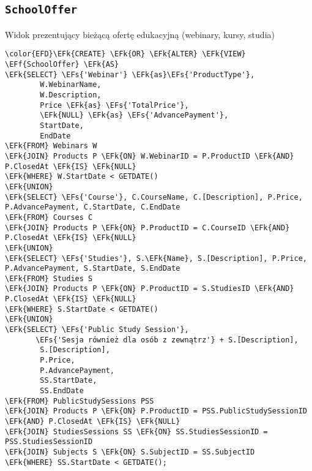 \documentclass[11pt]{article}
\newcommand{\EFs}[1]{\textcolor{EFs}{#1}} %
\newcommand{\EFk}[1]{\textcolor{EFk}{\textbf{#1}}} %
\newcommand{\EFf}[1]{\textcolor{EFf}{#1}} %
\begin{document}
\subsection{\texttt{SchoolOffer}}
\label{sec:orgd186820}
Widok prezentujący bieżącą ofertę edukacyjną (webinary, kursy, studia)
\begin{Code}
\begin{Verbatim}
\color{EFD}\EFk{CREATE} \EFk{OR} \EFk{ALTER} \EFk{VIEW} \EFf{SchoolOffer} \EFk{AS}
\EFk{SELECT} \EFs{'Webinar'} \EFk{as}\EFs{'ProductType'},
        W.WebinarName,
        W.Description,
        Price \EFk{as} \EFs{'TotalPrice'},
        \EFk{NULL} \EFk{as} \EFs{'AdvancePayment'},
        StartDate,
        EndDate
\EFk{FROM} Webinars W 
\EFk{JOIN} Products P \EFk{ON} W.WebinarID = P.ProductID \EFk{AND} P.ClosedAt \EFk{IS} \EFk{NULL}
\EFk{WHERE} W.StartDate < GETDATE()
\EFk{UNION}
\EFk{SELECT} \EFs{'Course'}, C.CourseName, C.[Description], P.Price, P.AdvancePayment, C.StartDate, C.EndDate
\EFk{FROM} Courses C 
\EFk{JOIN} Products P \EFk{ON} P.ProductID = C.CourseID \EFk{AND} P.ClosedAt \EFk{IS} \EFk{NULL}
\EFk{UNION}
\EFk{SELECT} \EFs{'Studies'}, S.\EFk{Name}, S.[Description], P.Price, P.AdvancePayment, S.StartDate, S.EndDate
\EFk{FROM} Studies S
\EFk{JOIN} Products P \EFk{ON} P.ProductID = S.StudiesID \EFk{AND} P.ClosedAt \EFk{IS} \EFk{NULL}
\EFk{WHERE} S.StartDate < GETDATE()
\EFk{UNION}
\EFk{SELECT} \EFs{'Public Study Session'},
       \EFs{'Sesja również dla osób z zewnątrz'} + S.[Description],
        S.[Description],
        P.Price, 
        P.AdvancePayment,
        SS.StartDate,
        SS.EndDate
\EFk{FROM} PublicStudySessions PSS 
\EFk{JOIN} Products P \EFk{ON} P.ProductID = PSS.PublicStudySessionID \EFk{AND} P.ClosedAt \EFk{IS} \EFk{NULL}
\EFk{JOIN} StudiesSessions SS \EFk{ON} SS.StudiesSessionID = PSS.StudiesSessionID
\EFk{JOIN} Subjects S \EFk{ON} S.SubjectID = SS.SubjectID
\EFk{WHERE} SS.StartDate < GETDATE();
\end{Verbatim}
\end{Code}
\end{document}
